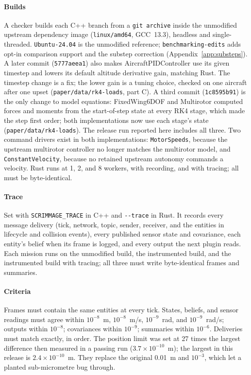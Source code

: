 \documentclass[conference]{IEEEtran}
\begin{document}
\paragraph{Builds}
A checker builds each C++ branch from a \texttt{git archive} inside the
unmodified upstream dependency image (\texttt{linux/amd64}, GCC~13.3), headless
and single-threaded. \texttt{Ubuntu-24.04} is the unmodified reference;
\texttt{benchmarking-edits} adds opt-in comparison support and the substep
correction (Appendix~\ref{app:substeps}). A later
commit (\texttt{5777aeea1}) also makes AircraftPIDController use its given
timestep and lowers its default altitude derivative gain, matching Rust. The
timestep change is a fix; the lower gain is
a tuning choice, checked on one aircraft after one upset
(\texttt{paper/data/rk4-loads}, part C). A third commit
(\texttt{1c8595b91}) is the only change to model equations: FixedWing6DOF and
Multirotor computed forces and moments from the start-of-step state at every
RK4 stage, which made the step first order; both implementations now use each
stage's state (\texttt{paper/data/rk4-loads}). The release run reported here
includes all three. Two command drivers exist in both implementations:
\texttt{MotorSpeeds}, because the upstream multirotor controller no longer
matches the multirotor model, and \texttt{ConstantVelocity}, because no retained
upstream autonomy commands a velocity. Rust runs at 1, 2, and 8 workers, with
recording, and with tracing; all must be byte-identical.

\paragraph{Trace}
Set with \texttt{SCRIMMAGE\_TRACE} in C++ and \texttt{-{}-trace} in Rust. It
records every message delivery (tick, network, topic, sender, receiver, and the
entities in lifecycle and collision events), every published sensor state and
covariance, each entity's belief when its frame is logged, and every output the
next plugin reads. Each mission runs on the unmodified build, the instrumented
build, and the instrumented build with tracing; all three must write
byte-identical frames and summaries.

\paragraph{Criteria}
Frames must contain the same entities at every tick. States, beliefs, and
sensor readings must agree within $10^{-8}$~m, $10^{-8}$~m/s, $10^{-9}$~rad, and
$10^{-9}$~rad/s; outputs within $10^{-8}$; covariances within $10^{-9}$;
summaries within $10^{-6}$. Deliveries must match exactly, in order. The
position limit was set at 27 times the largest difference then measured in a
passing run ($3.7\times10^{-10}$~m); the largest in this release is
$2.4\times10^{-10}$~m.
They replace the original 0.01~m and $10^{-3}$, which let a planted
sub-micrometre bug through.
\end{document}
